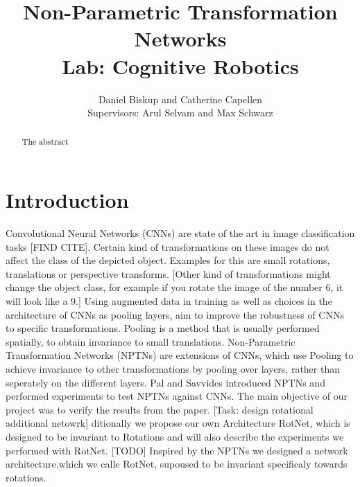 \documentclass{llncs}
\begin{document}
%
\frontmatter          %
%
\pagestyle{headings}  %
%
\mainmatter              %
%
\title{Non-Parametric Transformation Networks \\Lab: Cognitive Robotics}
%
%  
%
\author{Daniel Biskup and Catherine Capellen
 \\Supervisors: Arul Selvam and Max Schwarz}
%
%
%

\maketitle              %

\begin{abstract}
The abstract 
\end{abstract}
%

\section{Introduction}
Convolutional Neural Networks (CNNs) are state of the art in image classification tasks [FIND CITE]. Certain kind of transformations on these images do not affect the class of the depicted object. 
Examples for this are small rotations, translations or perspective transforms. [Other kind of transformations might change the object class, for example if you rotate the image of the number 6, it will look like a 9.] 
Using augmented data in training as well as choices in the architecture of CNNs as pooling layers, aim to improve the robustness of CNNs to specific transformations. 
Pooling is a method that is usually performed spatially, to obtain invariance to small translations. 
Non-Parametric Transformation Networks (NPTNs) are extensions of CNNs, which use Pooling to achieve invariance to other transformations by pooling over layers, rather than seperately on the different layers.
Pal and Savvides \cite{NPTN} introduced NPTNs and performed experiments to test NPTNs against CNNs. The main objective of our project was to verify the results from the paper. 
[Task: design rotational additional netowrk] ditionally we propose our own Architecture RotNet, which is designed to be invariant to Rotations and will also describe the experiments we performed with RotNet. 
[TODO]
Inspired by the NPTNs we designed a network architecture,which we calle RotNet, supoused to be invariant specificaly towards rotations.
\end{document}
